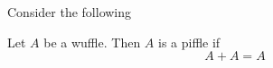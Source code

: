 Consider the following
\begin{theorem}
	Let
	$A$
	be a wuffle.
	Then
	$A$
	is a piffle if
	\begin{equation*}
		A + A = A
	\end{equation*}
\end{theorem}
